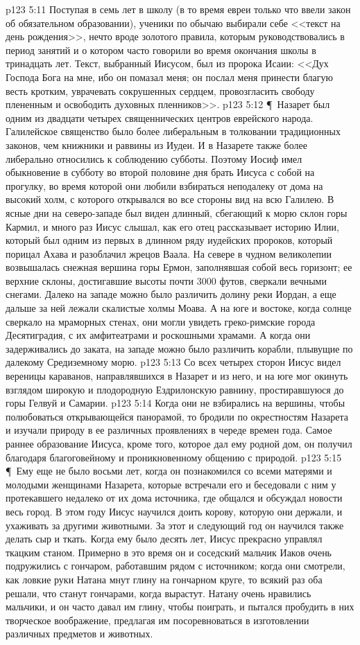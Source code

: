 \vs p123 5:11 Поступая в семь лет в школу (в то время евреи только что ввели закон об обязательном образовании), ученики по обычаю выбирали себе <<текст на день рождения>>, нечто вроде золотого правила, которым руководствовались в период занятий и о котором часто говорили во время окончания школы в тринадцать лет. Текст, выбранный Иисусом, был из пророка Исаии: <<Дух Господа Бога на мне, ибо он помазал меня; он послал меня принести благую весть кротким, уврачевать сокрушенных сердцем, провозгласить свободу плененным и освободить духовных пленников>>.
\vs p123 5:12 \P\ Назарет был одним из двадцати четырех священнических центров еврейского народа. Галилейское священство было более либеральным в толковании традиционных законов, чем книжники и раввины из Иудеи. И в Назарете также более либерально относились к соблюдению субботы. Поэтому Иосиф имел обыкновение в субботу во второй половине дня брать Иисуса с собой на прогулку, во время которой они любили взбираться неподалеку от дома на высокий холм, с которого открывался во все стороны вид на всю Галилею. В ясные дни на северо\hyp{}западе был виден длинный, сбегающий к морю склон горы Кармил, и много раз Иисус слышал, как его отец рассказывает историю Илии, который был одним из первых в длинном ряду иудейских пророков, который порицал Ахава и разоблачил жрецов Ваала. На севере в чудном великолепии возвышалась снежная вершина горы Ермон, заполнявшая собой весь горизонт; ее верхние склоны, достигавшие высоты почти 3000 футов, сверкали вечными снегами. Далеко на западе можно было различить долину реки Иордан, а еще дальше за ней лежали скалистые холмы Моава. А на юге и востоке, когда солнце сверкало на мраморных стенах, они могли увидеть греко\hyp{}римские города Десятиградия, с их амфитеатрами и роскошными храмами. А когда они задерживались до заката, на западе можно было различить корабли, плывущие по далекому Средиземному морю.
\vs p123 5:13 Со всех четырех сторон Иисус видел вереницы караванов, направлявшихся в Назарет и из него, и на юге мог окинуть взглядом широкую и плодородную Ездрилонскую равнину, простиравшуюся до горы Гелвуй и Самарии.
\vs p123 5:14 Когда они не взбирались на вершины, чтобы полюбоваться открывающейся панорамой, то бродили по окрестностям Назарета и изучали природу в ее различных проявлениях в череде времен года. Самое раннее образование Иисуса, кроме того, которое дал ему родной дом, он получил благодаря благоговейному и проникновенному общению с природой.
\vs p123 5:15 \P\ Ему еще не было восьми лет, когда он познакомился со всеми матерями и молодыми женщинами Назарета, которые встречали его и беседовали с ним у протекавшего недалеко от их дома источника, где общался и обсуждал новости весь город. В этом году Иисус научился доить корову, которую они держали, и ухаживать за другими животными. За этот и следующий год он научился также делать сыр и ткать. Когда ему было десять лет, Иисус прекрасно управлял ткацким станом. Примерно в это время он и соседский мальчик Иаков очень подружились с гончаром, работавшим рядом с источником; когда они смотрели, как ловкие руки Натана мнут глину на гончарном круге, то всякий раз оба решали, что станут гончарами, когда вырастут. Натану очень нравились мальчики, и он часто давал им глину, чтобы поиграть, и пытался пробудить в них творческое воображение, предлагая им посоревноваться в изготовлении различных предметов и животных.
